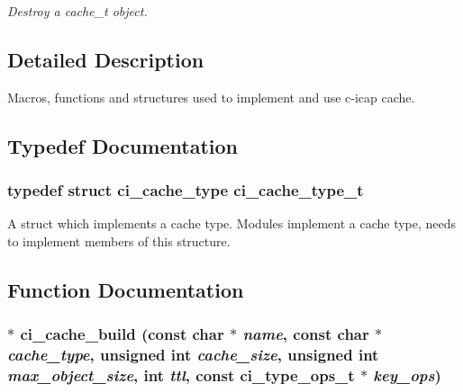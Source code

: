 \begin{DoxyCompactItemize}
\begin{DoxyCompactList}\small\item\em Destroy a cache\_\-t object. \item\end{DoxyCompactList}\end{DoxyCompactItemize}


\subsection{Detailed Description}
Macros, functions and structures used to implement and use c-\/icap cache. 

\subsection{Typedef Documentation}
\hypertarget{group__CACHE_ga2547be1d5fdb02626e6f63a419bac6bd}{
\subsubsection[{ci\_\-cache\_\-type\_\-t}]{\setlength{\rightskip}{0pt plus 5cm}typedef struct {\bf ci\_\-cache\_\-type}  {\bf ci\_\-cache\_\-type\_\-t}}}
\label{group__CACHE_ga2547be1d5fdb02626e6f63a419bac6bd}


A struct which implements a cache type. Modules implement a cache type, needs to implement members of this structure. 

\subsection{Function Documentation}
\hypertarget{group__CACHE_gab763186f35fc485777a5316bb5eb77fe}{
\subsubsection[{ci\_\-cache\_\-build}]{$\ast$ ci\_\-cache\_\-build (const char $\ast$ {\em name}, \/  const char $\ast$ {\em cache\_\-type}, \/  unsigned int {\em cache\_\-size}, \/  unsigned int {\em max\_\-object\_\-size}, \/  int {\em ttl}, \/  const ci\_\-type\_\-ops\_\-t $\ast$ {\em key\_\-ops})}}
\label{group__CACHE_gab763186f35fc485777a5316bb5eb77fe}


